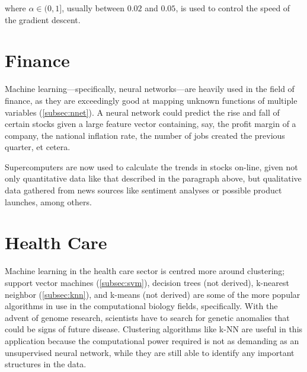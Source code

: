 \documentclass{comjnl}
\numberwithin{equation}{subsection}
\begin{document}
            \noindent where $\alpha \in (0,1]$, usually between $0.02$ and $0.05$, is used to
            control the speed of the gradient descent.


    \section{Finance}

        Machine learning---specifically, neural networks---are heavily used in the field of finance,
        as they are exceedingly good at mapping unknown functions of multiple variables
        (\ref{subsec:nnet}). A neural network could predict the rise and fall of certain stocks
        given a large feature vector containing, say, the profit margin of a company, the national
        inflation rate, the number of jobs created the previous quarter, et cetera.

        Supercomputers are now used to calculate the trends in stocks on-line, given not only
        quantitative data like that described in the paragraph above, but qualitative data gathered
        from news sources like sentiment analyses or possible product launches, among others.


    \section{Health Care}

        Machine learning in the health care sector is centred more around clustering; support vector
        machines (\ref{subsec:svm}), decision trees (not derived), k-nearest neighbor
        (\ref{subsec:knn}), and k-means (not derived) are some of the more popular algorithms in use
        in the computational biology fields, specifically. With the advent of genome research,
        scientists have to search for genetic anomalies that could be signs of future disease.
        Clustering algorithms like k-NN are useful in this application because the computational
        power required is not as demanding as an unsupervised neural network, while they are still
        able to identify any important structures in the data.

\end{document}
